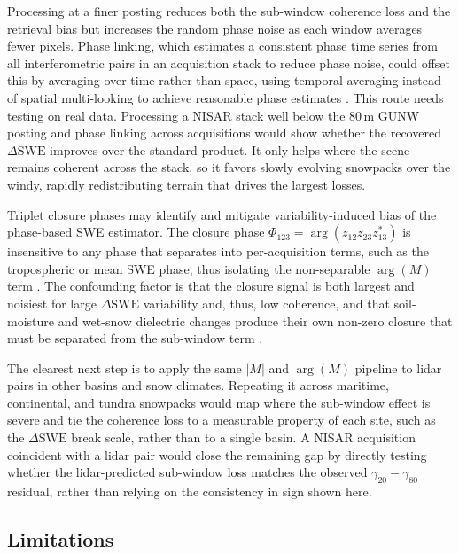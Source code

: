 \documentclass[tc, manuscript]{copernicus}
\begin{document}
Processing at a finer posting reduces both the sub-window coherence loss and the retrieval bias but increases the random phase noise as each window averages fewer pixels. Phase linking, which estimates a consistent phase time series from all interferometric pairs in an acquisition stack to reduce phase noise, could offset this by averaging over time rather than space, using temporal averaging instead of spatial multi-looking to achieve reasonable phase estimates \citep{Guarnieri2008, ansari2017sequential-aff, eppler2022adapting-c4d, zwieback2022cheap-026}. This route needs testing on real data. Processing a NISAR stack well below the 80\,\unit{m} GUNW posting and phase linking across acquisitions would show whether the recovered $\Delta\mathrm{SWE}$ improves over the standard product. It only helps where the scene remains coherent across the stack, so it favors slowly evolving snowpacks over the windy, rapidly redistributing terrain that drives the largest losses.

Triplet closure phases may identify and mitigate variability-induced bias of the phase-based SWE estimator. The closure phase $\Phi_{123}=\arg(z_{12}z_{23}z_{13}^{*})$
is insensitive to any phase that separates into per-acquisition terms, such as the tropospheric or mean SWE phase, thus isolating the non-separable $\arg(M)$ term \citep{zwieback2024temporal-426}. The confounding factor is that the closure signal is both largest and noisiest for large $\Delta\mathrm{SWE}$ variability and, thus, low coherence, and that soil-moisture and wet-snow dielectric changes produce their own non-zero closure that must be separated from the sub-window term \citep{Zan2014, zwieback2016statistical-d35}.

The clearest next step is to apply the same $|M|$ and $\arg(M)$ pipeline to lidar pairs in other basins and snow climates. Repeating it across maritime, continental, and tundra snowpacks would map where the sub-window effect is severe and tie the coherence loss to a measurable property of each site, such as the $\Delta\mathrm{SWE}$ break scale, rather than to a single basin. A NISAR acquisition coincident with a lidar pair would close the remaining gap by directly testing whether the lidar-predicted sub-window loss matches the observed $\gamma_{20}-\gamma_{80}$ residual, rather than relying on the consistency in sign shown here.

\subsection{Limitations}\label{subsec:limitations}
\end{document}
